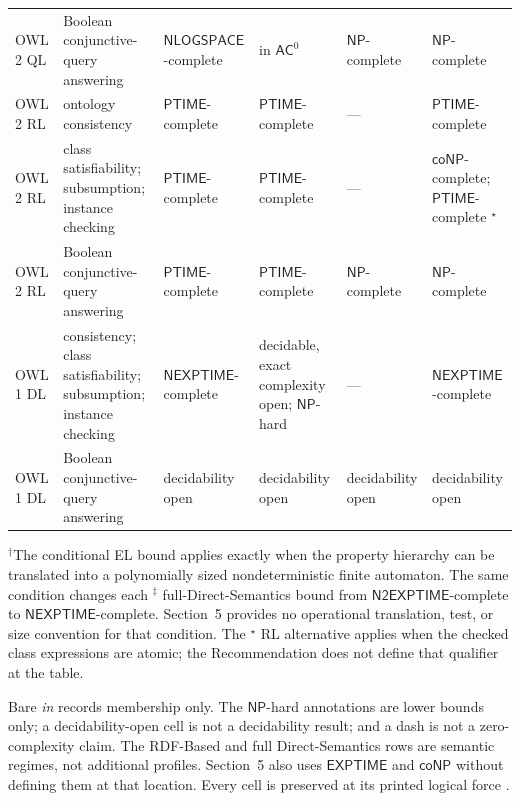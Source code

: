 \begin{longtable}{@{}p{}p{}p{}p{}p{}p{}@{}}
OWL 2 QL & Boolean conjunctive-query answering &
\(\mathsf{NLOGSPACE}\)-complete & in \(\mathsf{AC}^{0}\) &
\(\mathsf{NP}\)-complete & \(\mathsf{NP}\)-complete \\
\addlinespace
OWL 2 RL & ontology consistency &
\(\mathsf{PTIME}\)-complete & \(\mathsf{PTIME}\)-complete & --- &
\(\mathsf{PTIME}\)-complete \\
OWL 2 RL &
class satisfiability; subsumption; instance checking &
\(\mathsf{PTIME}\)-complete & \(\mathsf{PTIME}\)-complete & --- &
\(\mathsf{coNP}\)-complete; \(\mathsf{PTIME}\)-complete
\({}^{\star}\) \\
OWL 2 RL & Boolean conjunctive-query answering &
\(\mathsf{PTIME}\)-complete & \(\mathsf{PTIME}\)-complete &
\(\mathsf{NP}\)-complete & \(\mathsf{NP}\)-complete \\
\addlinespace
OWL 1 DL &
consistency; class satisfiability; subsumption; instance checking &
\(\mathsf{NEXPTIME}\)-complete &
decidable, exact complexity open; \(\mathsf{NP}\)-hard &
--- & \(\mathsf{NEXPTIME}\)-complete \\
OWL 1 DL & Boolean conjunctive-query answering &
decidability open & decidability open & decidability open & decidability open \\
\bottomrule
\end{longtable}

\noindent\({}^{\dagger}\)The conditional EL bound applies exactly when the
property hierarchy can be translated into a polynomially sized nondeterministic
finite automaton.  The same condition changes each
\({}^{\ddagger}\) full-Direct-Semantics bound from
\(\mathsf{N2EXPTIME}\)-complete to \(\mathsf{NEXPTIME}\)-complete.  Section~5
provides no operational translation, test, or size convention for that
condition.  The \({}^{\star}\) RL alternative applies when the checked class
expressions are atomic; the Recommendation does not define that qualifier at
the table.

Bare \emph{in} records membership only.  The \(\mathsf{NP}\)-hard annotations
are lower bounds only; a decidability-open cell is not a decidability result;
and a dash is not a zero-complexity claim.  The RDF-Based and full
Direct-Semantics rows are semantic regimes, not additional profiles.  Section~5
also uses \(\mathsf{EXPTIME}\) and \(\mathsf{coNP}\) without defining them at
that location.  Every cell is preserved at its printed logical force
\cite[\S5 and table~10]{W3COWL2Profiles2012}.
\endgroup




